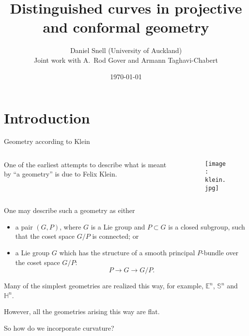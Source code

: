 \documentclass{beamer}
\title[Distinguished curves]{Distinguished curves in projective and conformal geometry}
\author[Daniel Snell (UoA)]{Daniel Snell (University of Auckland)\\{ \bigskip\bigskip \small Joint work with
A.\ Rod Gover and Armann Taghavi-Chabert}}
\date{\today}
\begin{document}
\begin{frame}
  \titlepage
\end{frame}

\section{Introduction}

\begin{frame}{Geometry according to Klein}
  \vspace{-10pt}
  \begin{columns}
    \begin{column}{0.6\textwidth}
  One of the earliest attempts to describe what is meant by ``a geometry'' is due
  to Felix Klein.
  \end{column}
    \begin{column}{0.4\textwidth}
      \begin{figure}
        \texttt{[image: klein.jpg]}
      \end{figure}
    \end{column}
  \end{columns}
  One may describe such a geometry as either
  \begin{itemize}
    \pause
    \item a pair $(G,P)$, where $G$ is a Lie group and $P\subset G$ is a closed
      subgroup, such that the coset space $G/P$ is connected; or
    \pause
    \item a Lie group $G$ which has the structure of a smooth principal
      $P$-bundle over the coset space $G/P$:
      \[
        P \to G \to G/P.
      \]
  \end{itemize}
  \pause
  Many of the simplest geometries are realized this way, for example,
  $\mathbb{E}^n$, $\mathbb{S}^n$ and $\mathbb{H}^n$. 

  However, all the geometries arising this way are flat. 

  So how do we incorporate curvature? 
\end{frame}
\end{document}
